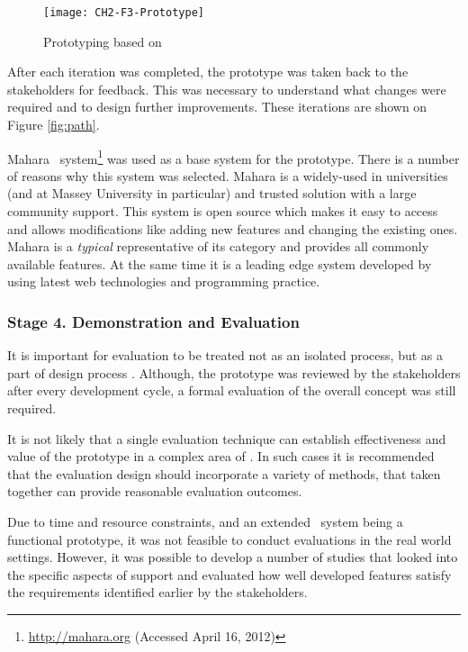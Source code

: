 \begin{figure}[htb]
\centering
\texttt{[image: CH2-F3-Prototype]}
\caption[Prototyping]{Prototyping based on \citet*[p.~411]{Sommerville2007}}
\label{fig:prototype}
\end{figure}

After each iteration was completed, the prototype was taken back to the
stakeholders for feedback. This was necessary to understand what changes were
required and to design further improvements. These iterations are shown on
Figure \ref{fig:path}.

Mahara \ep~system\footnote{\url{http://mahara.org} (Accessed April 16, 2012)}
was used as a base system for the prototype. There is a number of reasons why this system was selected.
Mahara is a widely-used in universities (and at Massey University in particular)
and trusted solution with a large community support. This system is open source
which makes it easy to access and allows modifications like adding new features
and changing the existing ones. Mahara is a \textit{typical} representative of
its category and provides all commonly available features. At the same time it
is a leading edge system developed by using latest web technologies and
programming practice.

\subsubsection{Stage 4. Demonstration and Evaluation}

It is important for evaluation to be treated not as an isolated process, but as
a part of design process \citep{Cleven2009}. Although, the prototype was
reviewed by the stakeholders after every development cycle, a formal evaluation
of the overall concept was still required.

It is not likely that a single evaluation technique can establish effectiveness
and value of the prototype in a complex area of \LLLsn. In such cases it is
recommended \citep{Quinlan2008} that the evaluation design should incorporate a
variety of methods, that taken together can provide reasonable evaluation
outcomes.

Due to time and resource constraints, and an extended \ep~system being a
functional prototype, it was not feasible to conduct evaluations in the real
world settings. However, it was possible to develop a number of studies that
looked into the specific aspects of \LLLs support and evaluated how well
developed features satisfy the requirements identified earlier by the
stakeholders.
 
